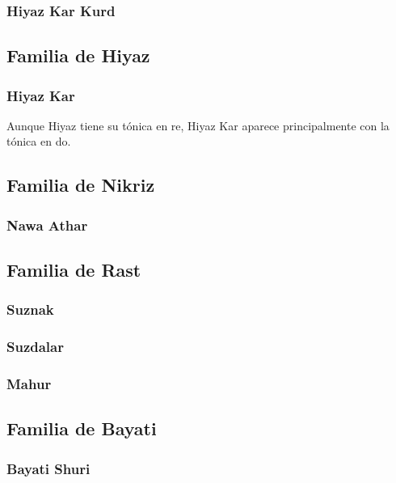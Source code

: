 \subsubsection{\Maqam Hiyaz Kar Kurd}


\subsection{Familia de \yins Hiyaz}

\subsubsection{\Maqam Hiyaz Kar}

Aunque \maqam Hiyaz tiene su tónica en re, \maqam Hiyaz Kar aparece principalmente con la tónica en do.



\subsection{Familia de \yins Nikriz}
\subsubsection{\Maqam Nawa Athar}


\subsection{Familia de \yins Rast}
\subsubsection{\Maqam Suznak}

\subsubsection{\Maqam Suzdalar}

\subsubsection{\Maqam Mahur}


\subsection{Familia de \yins Bayati}
\subsubsection{\Maqam Bayati Shuri}


